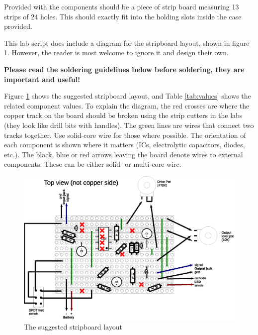 \documentclass[a4paper]{article}
\begin{document}
	Provided with the components should be a piece of strip board measuring
	13 strips of 24 holes. This should exactly fit into the holding slots 
	inside the case provided. 
	
	This lab script does include a diagram for the stripboard layout, shown in figure
	\ref{fig:stripboard}. However, the reader is most welcome to ignore it and design
	their own. 
	
	\textbf{Please read the soldering guidelines below before soldering, they are 
	important and useful!}
	
	Figure \ref{fig:stripboard} shows the suggested stripboard layout, and Table 
	\ref{tab:values} shows the related component values. To explain the diagram,
	the red crosses are where the copper track on the board should be broken using 
	the strip cutters in the labs (they look like drill bits with handles). The 
	green lines are wires that connect two tracks together. Use solid-core wire for 
	those where possible. The orientation of each component is shown where it matters 
	(ICs, electrolytic capacitors, diodes, etc.). The black, blue or red arrows 
	leaving the board denote 
	wires to external components. These can be either solid- or multi-core wire. 
	
	\begin{figure}[ht]
		\centering
		\includegraphics[angle=90, scale=0.9]{stripboard.eps}
		\caption{The suggested stripboard layout}
		\label{fig:stripboard}
	\end{figure}
	
\end{document}
